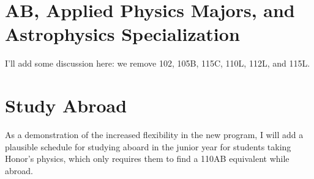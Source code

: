 \documentclass[12pt]{article}
\begin{document}
\section{AB, Applied Physics Majors, and Astrophysics Specialization}

I'll add some discussion here:  we remove 102, 105B, 115C, 110L, 112L, and 115L.

\section{Study Abroad}

As a demonstration of the increased flexibility in the new program, I will add a plausible schedule for studying aboard in the junior year for students taking Honor's physics, which only requires them to find a 110AB equivalent while abroad.
\end{document}

